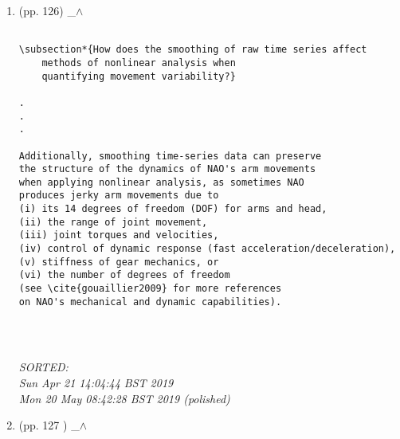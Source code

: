 \documentclass[12pt]{article}
\begin{document}
\begin{enumerate}

\item  (pp. 126)  \_$\wedge$  

%


	\begin{verbatim}
	
\subsection*{How does the smoothing of raw time series affect 
	methods of nonlinear analysis when 
	quantifying movement variability?}

.
.
.

Additionally, smoothing time-series data can preserve 
the structure of the dynamics of NAO's arm movements 
when applying nonlinear analysis, as sometimes NAO 
produces jerky arm movements due to 
(i) its 14 degrees of freedom (DOF) for arms and head,
(ii) the range of joint movement, 
(iii) joint torques and velocities, 
(iv) control of dynamic response (fast acceleration/deceleration), 
(v) stiffness of gear mechanics, or
(vi) the number of degrees of freedom
(see \cite{gouaillier2009} for more references
on NAO's mechanical and dynamic capabilities).




	\end{verbatim}
	\textit{
	SORTED: \\
	Sun Apr 21 14:04:44 BST 2019 \\
	 Mon 20 May 08:42:28 BST 2019 (polished) 
	}
	\\



\item  (pp. 127 )  \_$\wedge$  



\end{enumerate}
\end{document}
